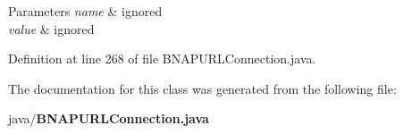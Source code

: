 \begin{DoxyParams}{Parameters}
{\em name} & ignored \\
\hline
{\em value} & ignored \\
\hline
\end{DoxyParams}


Definition at line 268 of file B\+N\+A\+P\+U\+R\+L\+Connection.\+java.



The documentation for this class was generated from the following file\+:\begin{DoxyCompactItemize}
\item 
java/{\bf B\+N\+A\+P\+U\+R\+L\+Connection.\+java}\end{DoxyCompactItemize}
